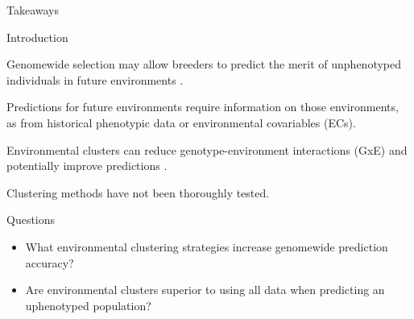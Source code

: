 \documentclass[final]{beamer}
\newlength{\onecolwid}
\begin{document}
\begin{frame}[t]
\begin{columns}[t]
\begin{column}{\onecolwid}
\begin{alertblock}{\Large{Takeaways}}

\end{alertblock}


\begin{block}{Introduction}


Genomewide selection may allow breeders to predict the merit of unphenotyped individuals in future environments \cite{Malosetti2016a, Jarquin2017}.

\vspace{0.5cm}

Predictions for future environments require information on those environments, as from historical phenotypic data or environmental covariables (ECs).

\vspace{0.5cm}

Environmental clusters can reduce genotype-environment interactions (GxE)\cite{Bernardo2010} and potentially improve predictions \cite{Lado2016a}.

\vspace{0.5cm}

Clustering methods have not been thoroughly tested.



\end{block}




\begin{alertblock}{\large{Questions}}

\begin{footnotesize}

\begin{itemize}r
  \item What environmental clustering strategies increase genomewide prediction accuracy?
  \item Are environmental clusters superior to using all data when predicting an uphenotyped population?
\end{itemize}


\end{footnotesize}
\end{alertblock}
\end{column}
\end{columns}
\end{frame}
\end{document}
